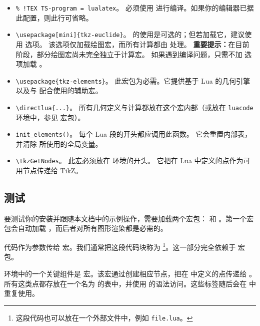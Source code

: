 \begin{itemize}
\item \verb|% !TEX TS-program = lualatex|。
必须使用  进行编译。如果你的编辑器已据此配置，则此行可省略。

\item \verb|\usepackage[mini]{tkz-euclide}|。
 的使用是可选的；但若加载它，建议使用  选项。
该选项仅加载绘图宏，而所有计算都由  处理。
\textbf{重要提示：}在目前阶段，部分绘图宏尚未完全独立于计算宏。
如果遇到编译问题，只需不加  选项加载 。

\item \verb|\usepackage{tkz-elements}|。
此宏包为必需。它提供基于 Lua 的几何引擎以及与  配合使用的辅助宏。

\item \verb|\directlua{...}|。
所有几何定义与计算都放在这个宏内部（或放在 \texttt{luacode} 环境中，参见  宏包）。

\item \verb|init_elements()|。
每个 Lua 段的开头都应调用此函数。
它会重置内部表，并清除  所使用的全局变量。

\item \verb|\tkzGetNodes|。
此宏必须放在  环境的开头。
它把在 Lua 中定义的点作为可用节点传递给 TikZ。
\end{itemize}



\subsection{测试}

要测试你的安装并跟随本文档中的示例操作，需要加载两个宏包： 和 。第一个宏包会自动加载 \tkzNamePack{\TIKZ}，而后者对所有图形渲染都是必需的。


 代码作为参数传给  宏。我们通常把这段代码块称为  \footnote{这段代码也可以放在一个外部文件中，例如 \texttt{file.lua}。}。这一部分完全依赖于  宏包。

 环境中的一个关键组件是  宏。该宏通过创建相应节点，把在  中定义的点传递给 \tkzNamePack{\TIKZ}。所有这类点都存放在一个名为  的表中，并使用  的语法访问。这些标签随后会在  中重复使用。

